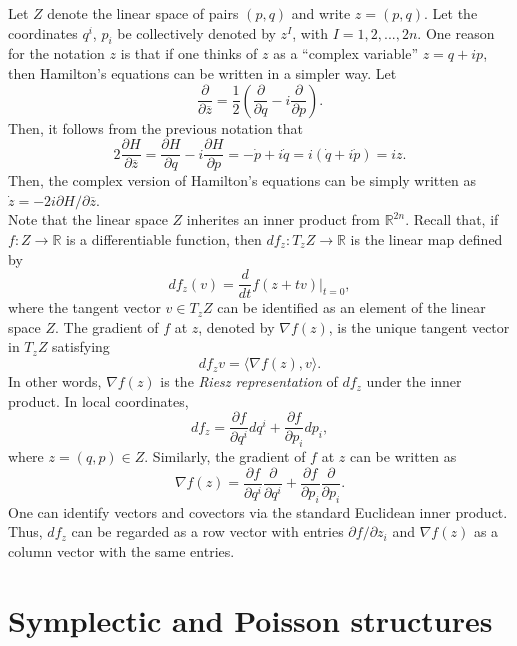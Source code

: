 Let $Z$ denote the linear space of pairs $(p,q)$ and write $z=(p,q)$. Let the coordinates $q^i$, $p_i$ be collectively denoted by $z^I$, with $I=1,2,...,2n$. One reason for the notation $z$ is that if one thinks of $z$ as a ``complex variable'' $z=q+ip$, then Hamilton's equations can be written in a simpler way. Let
$$
\frac{\partial}{\partial \overline z}=\frac{1}2\left(\frac{\partial }{\partial q}-i\frac{\partial}{\partial p}\right).
$$
Then, it follows from the previous notation that
$$
2\frac{\partial H}{\partial \overline z}=\frac{\partial H}{\partial q}-i\frac{\partial H}{\partial p}=-\dot p+i\dot q=i(\dot q+i\dot p)=iz.
$$
Then, the complex version of Hamilton's equations can be simply written as $\dot z=-2i \partial H/\partial \overline z$.\\

Note that the linear space $Z$ inherites an inner product from $\mathbb R^{2n}$. Recall that, if $f:Z\to \mathbb R$ is a differentiable function, then $df_z: T_zZ\to \mathbb R$ is the linear map defined by
$$
df_z(v)=\frac{d}{dt}f(z+tv)\bigg|_{t=0},
$$
where the tangent vector $v\in T_zZ$ can be identified as an element of the linear space $Z$. The gradient of $f$ at $z$, denoted by $\nabla f(z)$, is the unique tangent vector in $T_zZ$ satisfying
$$
df_zv=\langle \nabla f(z), v\rangle.
$$
In other words, $\nabla f(z)$ is the \emph{Riesz representation} of $df_z$ under the inner product. In local coordinates, 
$$
df_z=\frac{\partial f}{\partial q^i}dq^{i}+\frac{\partial f}{\partial p_i}dp_i,
$$
where $z=(q, p)\in Z$. Similarly, the gradient of $f$ at $z$ can be written as
$$
\nabla f(z)=\frac{\partial f}{\partial q^i}\frac{\partial}{\partial q^i}+\frac{\partial f}{\partial p_i}\frac{\partial}{\partial p_i}.
$$
One can identify vectors and covectors via the standard Euclidean inner product. Thus, $df_z$ can be regarded as a row vector with entries $\partial f/\partial z_i$ and $\nabla f(z)$ as a column vector with the same entries.

\section{Symplectic and Poisson structures}

